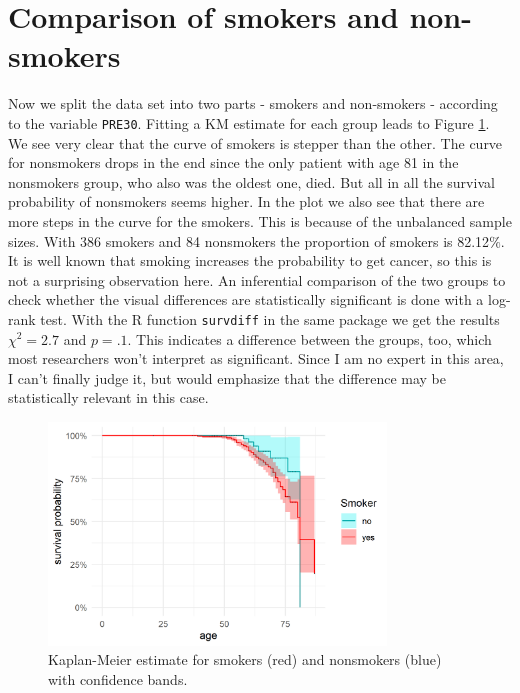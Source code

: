 \section{Comparison of smokers and non-smokers}
Now we split the data set into two parts - smokers and non-smokers - according to the variable \texttt{PRE30}. Fitting a KM estimate for each group leads to Figure \ref{5nonpargroups}. We see very clear that the curve of smokers is stepper than the other. The curve for nonsmokers drops in the end since the only patient with age 81 in the nonsmokers group, who also was the oldest one, died. But all in all the survival probability of nonsmokers seems higher. In the plot we also see that there are more steps in the curve for the smokers. This is because of the unbalanced sample sizes. With 386 smokers and 84 nonsmokers the proportion of smokers is 82.12$\%$. It is well known that smoking increases the probability to get cancer, so this is not a surprising observation here. An inferential comparison of the two groups to check whether the visual differences are statistically significant is done with a log-rank test. With the R function \texttt{survdiff} in the same package we get the results $\chi ^2=2.7$ and $p=.1$. This indicates a difference between the groups, too, which most researchers won't interpret as significant. Since I am no expert in this area, I can't finally judge it, but would emphasize that the difference may be statistically relevant in this case.
\begin{figure}[!htb]
\centering
\includegraphics[width=0.8\textwidth, keepaspectratio]{ex4/smokers.png}
\caption{Kaplan-Meier estimate for smokers (red) and nonsmokers (blue) with confidence bands.}
\label{5nonpargroups}
\end{figure} 

